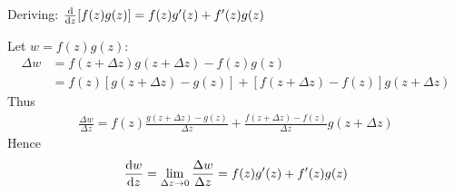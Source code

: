 \documentclass[12pt, english]{book}
\makeatletter
\renewenvironment{proof}[1][\proofname]{\par
	\pushQED{\qed}%
	\normalfont \topsep6\p@\@plus6\p@\relax
	\list{}{%
		\settowidth{\leftmargin}{\itshape\proofname:\hskip\labelsep}%
		\setlength{\labelwidth}{0pt}%
		\setlength{\itemindent}{-\leftmargin}%
		}%
	\item[\hskip\labelsep\itshape#1\@addpunct{:}]\ignorespaces
	}{\popQED\endlist\@endpefalse}
\makeatother
\begin{document}
	\begin{proof}
		Deriving: \( \dv{z}[f(z)g(z)] = f(z)g'(z) + f'(z)g(z) \)
		
		Let \(w = f(z) g(z)\): 
		\begin{align*}
			\Delta w &= f(z + \Delta z) g(z + \Delta z ) - f(z) g(z)\\
				&=f(z)[g(z + \Delta z) - g(z)] + [f(z + \Delta z) - f(z)] g(z + \Delta z)
		\end{align*}
		Thus
		\begin{align*}
			\frac{\Delta w}{\Delta z}
			= f(z)\frac{g(z + \Delta z) - g(z)}{\Delta z} + \frac{f(z + \Delta z) - f(z)}{\Delta z} g(z + \Delta z)
		\end{align*}
		Hence
		\begin{align*}
			\dv{w}{z} =	\lim_{\Delta z \rightarrow 0} \frac{\Delta w}{\Delta z} = f(z)g'(z) + f'(z)g(z)
		\end{align*}
	\end{proof}
	
\end{document}
